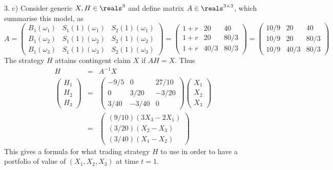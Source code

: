 \documentclass[11pt,a4paper]{article}
\begin{document}
\begin{answer}{3. c)}
  Consider generic $X,H\in\reals^3$ and define matrix $A\in\reals^{3\times3}$, which summarise this model, as
  \[ A=\begin{pmatrix}
    B_1(\omega_1)&S_1(1)(\omega_1)&S_2(1)(\omega_1)\\
    B_1(\omega_2)&S_1(1)(\omega_2)&S_2(1)(\omega_2)\\
    B_1(\omega_3)&S_1(1)(\omega_3)&S_2(1)(\omega_3)
  \end{pmatrix}=\begin{pmatrix}
    1+r&20&40\\
    1+r&20&80/3\\
    1+r&40/3&80/3
  \end{pmatrix}=\begin{pmatrix}
    10/9&20&40\\
    10/9&20&80/3\\
    10/9&40/3&80/3
  \end{pmatrix} \]
  The strategy $H$ attains contingent claim $X$ if $AH=X$. Thus
  \[\begin{array}{rcl}
    H&=&A^{-1}X\\
    \begin{pmatrix}
      H_1\\H_2\\H_3
    \end{pmatrix}&=&
    \begin{pmatrix}
      -9/5&0&27/10\\
      0&3/20&-3/20\\
      3/40&-3/40&0
    \end{pmatrix}\begin{pmatrix}
      X_1\\X_2\\X_3
    \end{pmatrix}\\
    &=&\begin{pmatrix}
        (9/10)(3X_3-2X_1)\\
        (3/20)(X_2-X_3)\\
        (3/40)(X_1-X_2)
      \end{pmatrix}
  \end{array}\]
  This gives a formula for what trading strategy $H$ to use in order to have a portfolio of value of $(X_1,X_2,X_3)$ at time $t=1$.
\end{answer}
\end{document}

